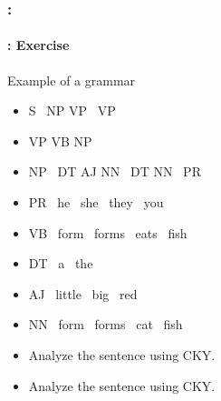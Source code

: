 \documentclass[xcolor=table]{beamer}
\begin{document}
\begin{frame}
	\frametitle{\insertshortsubtitle: \insertsection}
	\framesubtitle{\insertsubsection: Exercise}

	\begin{exampleblock}{Example of a grammar}
		\begin{itemize}
			\item S \textrightarrow\ NP VP \textbar\ VP
			\item VP \textrightarrow VB NP
			\item NP \textrightarrow\ DT AJ NN \textbar\ DT NN \textbar\ PR 
			\item PR \textrightarrow\ he \textbar\ she \textbar\ they \textbar\ you
			\item VB \textrightarrow\ form \textbar\ forms \textbar\ eats \textbar\ fish
			\item DT \textrightarrow\ a \textbar\ the
			\item AJ \textrightarrow\ little \textbar\ big \textbar\ red 
			\item NN \textrightarrow\ form \textbar\ forms \textbar\ cat \textbar\ fish
		\end{itemize}
	\end{exampleblock}\vspace{-6pt}
	
	\begin{itemize}
		\item Analyze the sentence  using CKY.
		\item Analyze the sentence  using CKY.
	\end{itemize}

\end{frame}
\end{document}
